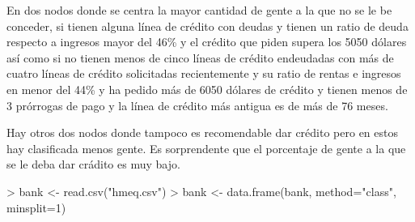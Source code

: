 \documentclass [a4paper] {article}
\begin{document}
En dos nodos donde se centra la mayor cantidad de gente a la que no se le be conceder,
si tienen alguna línea de crédito con deudas y
tienen un ratio de deuda respecto a ingresos mayor del 46\% y
el crédito que piden supera los 5050 dólares así como
si no tienen menos de cinco líneas de crédito endeudadas
con más de cuatro líneas de crédito solicitadas recientemente y
su ratio de rentas e ingresos en menor del 44\% y
ha pedido más de 6050 dólares de crédito y
tienen menos de 3 prórrogas de pago y
la línea de crédito más antigua es de más de 76 meses.

Hay otros dos nodos donde tampoco es recomendable dar crédito pero en estos hay clasificada menos gente.
Es sorprendente que el porcentaje de gente a la que se le deba dar crádito es muy bajo.
\begin{Schunk}
\begin{Sinput}
> bank <- read.csv("hmeq.csv")
> bank <- data.frame(bank, method="class", minsplit=1)
\end{Sinput}
\end{Schunk}
\end{document}
